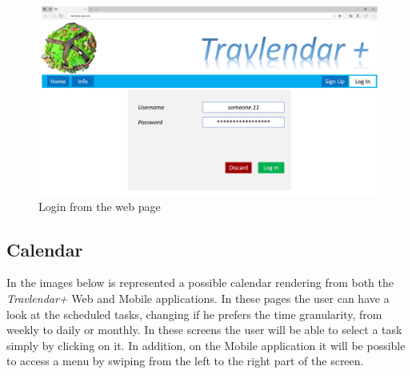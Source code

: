 \begin{figure}[H]
    \centering
    \includegraphics[scale=0.25]{Pictures/Mockups/SiteLogin.png}
    \caption{Login from the web page}
\end{figure}

\subsection*{Calendar}
In the images below is represented a possible calendar rendering from both the \emph{Travlendar+} Web and Mobile applications. In these pages the user can have a look at the scheduled tasks, changing if he prefers the time granularity, from weekly to daily or monthly. In these screens the user will be able to select a task simply by clicking on it. In addition, on the Mobile application it will be possible to access a menu by swiping from the left to the right part of the screen.   

